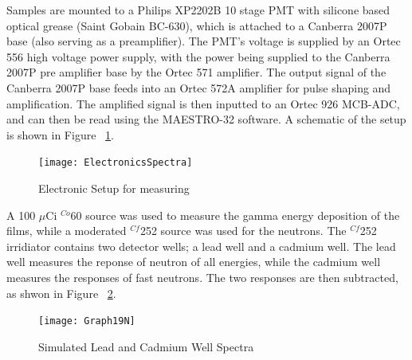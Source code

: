 \documentclass{anstrans}
\newcommand{\iso}[2]{${}^{#2}${#1}}
\begin{document}
Samples are mounted to a Philips XP2202B 10 stage PMT with silicone based optical grease (Saint Gobain BC-630), which is attached to a Canberra 2007P base (also serving as a preamplifier).   
The PMT’s voltage is supplied by an Ortec 556 high voltage power supply, with the power being supplied to the Canberra 2007P pre amplifier base by the Ortec 571 amplifier.  
The output signal of the Canberra 2007P base feeds into an Ortec 572A amplifier for pulse shaping and amplification. 
The amplified signal is then inputted to an Ortec 926 MCB-ADC, and can then be read using the MAESTRO-32 software. 
A schematic of the setup is shown in Figure ~\ref{fig:ElectronicsSpectra}.
\begin{figure}
	\centering
	\texttt{[image: ElectronicsSpectra]}
	\caption{Electronic Setup for measuring}
	\label{fig:ElectronicsSpectra}
\end{figure}
A 100 $\mu$Ci \iso{60}{Co} source was used to measure the gamma energy deposition of the films, while a moderated \iso{252}{Cf} source was used for the neutrons.
The \iso{252}{Cf} irridiator contains two detector wells; a lead well and a cadmium well.
The lead well measures the reponse of neutron of all energies, while the cadmium well measures the responses of fast neutrons.
The two responses are then subtracted, as shwon in Figure ~\ref{fig:SimPbCdSpectra}.
	\begin{figure}
		\centering
		\texttt{[image: Graph19N]}
		\caption{Simulated Lead and Cadmium Well Spectra}
		\label{fig:SimPbCdSpectra}
	\end{figure}
\end{document}
